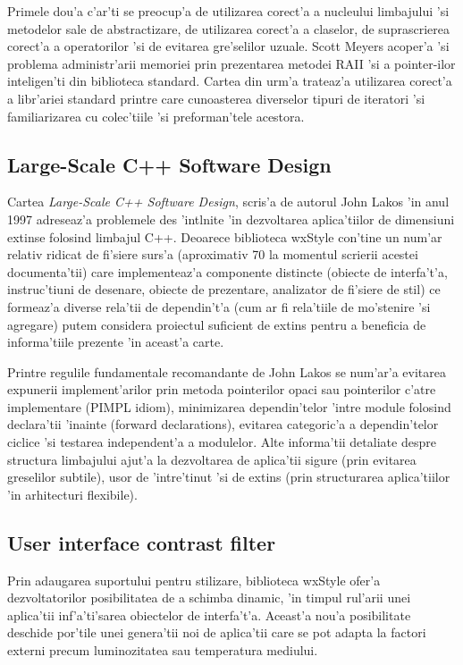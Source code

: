 \medskip

Primele dou'a c'ar'ti se preocup'a de utilizarea corect'a a nucleului limbajului 'si metodelor sale de abstractizare, de utilizarea corect'a a claselor, de suprascrierea corect'a a operatorilor 'si de evitarea gre'selilor uzuale. Scott Meyers acoper'a 'si problema administr'arii memoriei prin prezentarea metodei RAII 'si a pointer-ilor inteligen'ti din biblioteca standard. Cartea din urm'a trateaz'a utilizarea corect'a a libr'ariei standard printre care cunoasterea diverselor tipuri de iteratori 'si familiarizarea cu colec'tiile 'si preforman'tele acestora.

\subsection{Large-Scale C++ Software Design}

Cartea \emph{Large-Scale C++ Software Design}\cite{largescalecpp}, scris'a de autorul John Lakos 'in anul 1997 adreseaz'a problemele des 'int{\ia}lnite 'in dezvoltarea aplica'tiilor de dimensiuni extinse folosind limbajul C++. Deoarece biblioteca wxStyle con'tine un num'ar relativ ridicat de fi'siere surs'a (aproximativ 70 la momentul scrierii acestei documenta'tii) care implementeaz'a componente distincte (obiecte de interfa't'a, instruc'tiuni de desenare, obiecte de prezentare, analizator de fi'siere de stil) ce formeaz'a diverse rela'tii de dependin't'a (cum ar fi rela'tiile de mo'stenire 'si agregare) putem considera proiectul suficient de extins pentru a beneficia de informa'tiile prezente 'in aceast'a carte.

\medskip

Printre regulile fundamentale recomandante de John Lakos se num'ar'a evitarea expunerii implement'arilor prin metoda pointerilor opaci sau pointerilor c'atre implementare (PIMPL idiom), minimizarea dependin'telor 'intre module folosind declara'tii 'inainte (forward declarations), evitarea categoric'a a dependin'telor ciclice 'si testarea independent'a a modulelor. Alte informa'tii detaliate despre structura limbajului ajut'a la dezvoltarea de aplica'tii sigure (prin evitarea greselilor subtile), usor de 'intre'tinut 'si de extins (prin structurarea aplica'tiilor 'in arhitecturi flexibile).

\subsection{User interface contrast filter}

Prin adaugarea suportului pentru stilizare, biblioteca wxStyle ofer'a dezvoltatorilor posibilitatea de a schimba dinamic, 'in timpul rul'arii unei aplica'tii inf'a'ti'sarea obiectelor de interfa't'a. Aceast'a nou'a posibilitate deschide por'tile unei genera'tii noi de aplica'tii care se pot adapta la factori externi precum luminozitatea sau temperatura mediului.

